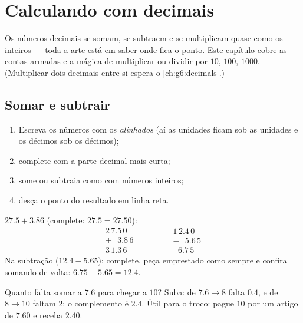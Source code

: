 \chapter{Calculando com decimais}\label{ch:g5:decimalops}

Os números decimais se somam, se subtraem e se multiplicam quase
como os inteiros --- toda a arte está em saber onde fica o ponto.
Este capítulo cobre as contas armadas e a mágica de multiplicar ou
dividir por $10$, $100$, $1000$. (Multiplicar dois decimais entre si
espera o \cref{ch:g6:decimals}.)

\section{Somar e subtrair}

\begin{method}\label{met:g5:decimalops:addsub}
\begin{enumerate}
  \item Escreva os números com os \emph{ alinhados}
        (aí as unidades ficam sob as unidades e os décimos sob os
        décimos);
  \item complete com  a parte decimal mais curta;
  \item some ou subtraia como com números inteiros;
  \item desça o ponto do resultado em linha reta.
\end{enumerate}
\end{method}

\begin{example}\label{ex:g5:decimalops:addsub}
$27.5 + 3.86$ (complete: $27.5 = 27.50$):
\[
\begin{array}{r}
2\,7.5\,0 \\
+\ \ \ 3.8\,6 \\
\hline
3\,1.3\,6
\end{array}
\qquad\qquad
\begin{array}{r}
1\,2.4\,0 \\
-\ \ \ 5.6\,5 \\
\hline
\ \ \,6.7\,5
\end{array}
\]
Na subtração ($12.4 - 5.65$): complete, peça emprestado como sempre e
confira somando de volta: $6.75 + 5.65 = 12.4$.
\end{example}

\begin{example}\label{ex:g5:decimalops:complement}
Quanto falta somar a $7.6$ para chegar a $10$? Suba: de $7.6 \to 8$
falta $0.4$, e de $8 \to 10$ faltam $2$: o complemento é $2.4$. Útil
para o troco: pague $10$ por um artigo de $7.60$ e receba $2.40$.
\end{example}

